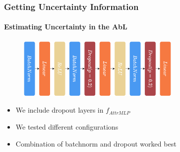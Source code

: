 \documentclass[9pt]{beamer}
\begin{document}
















\begin{frame}
\frametitle{Getting Uncertainty Information}
\framesubtitle{Estimating Uncertainty in the AbL}
\begin{figure}
	\centering
	\includegraphics[width=0.7\textwidth]{images/f_attrMLP.pdf}
\end{figure}
\begin{itemize}
	\item We include dropout layers in $f_{AttrMLP}$
	\item We tested different configurations
	\item Combination of batchnorm and dropout worked best
\end{itemize}
\end{frame}
\end{document}
